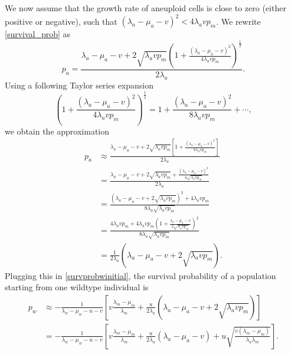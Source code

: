 \documentclass[12pt]{extarticle}
\begin{document}
We now assume that the growth rate of aneuploid cells is close to zero (either positive or negative), such that  $\left(\lambda_a-\mu_a-v\right)^2 < 4\lambda_avp_m$.
We rewrite \cref{survival_prob} as
\begin{equation}
p_a=\frac{\lambda_a-\mu_a-v+2\sqrt{\lambda_a vp_m}\left(1+\frac{\left(\lambda_a-\mu_a-v\right)^2}{4\lambda_avp_m}\right)^{\frac12}}{2\lambda_a} .
\end{equation}
Using a following Taylor series expansion
\begin{equation*}
\left(1+\frac{\left(\lambda_a-\mu_a-v\right)^2}{4\lambda_avp_m}\right)^{\frac{1}{2}}=1+\frac{\left(\lambda_a-\mu_a-v\right)^2}{8\lambda_avp_m}+\cdots,
\end{equation*}
we obtain the approximation
\begin{equation}
\begin{aligned}
p_a&\approx\frac{\lambda_a-\mu_a-v+2\sqrt{\lambda_a vp_m}\left[1+\frac{\left(\lambda_a-\mu_a-v\right)^2}{8\lambda_avp_m}\right]}{2\lambda_a}\\
&=\frac{\lambda_a-\mu_a-v+2\sqrt{\lambda_a vp_m}+\frac{\left(\lambda_a-\mu_a-v\right)^2}{4\sqrt{\lambda_avp_m}}}{2\lambda_a}\\
&=\frac{\left(\lambda_a-\mu_a-v+2\sqrt{\lambda_avp_m}\right)^2+4\lambda_avp_m}{8\lambda_a\sqrt{\lambda_avp_m}}\\
&=\frac{4\lambda_avp_m+4\lambda_avp_m\left(1+\frac{\lambda_a-\mu_a-v}{2\sqrt{\lambda_avp_m}}\right)^2}{8\lambda_a\sqrt{\lambda_avp_m}}\\
&=\frac{1}{2\lambda_a}\left(\lambda_a-\mu_a-v+2\sqrt{\lambda_avp_m}\right).
\end{aligned}
\end{equation}
Plugging this in \cref{survprobwinitial}, the survival probability of a population starting from one wildtype individual is
\begin{equation}\label{scenario3}
\begin{aligned}
p_w&\approx-\frac{1}{\lambda_w-\mu_w-u-v}\left[v\frac{\lambda_m-\mu_m}{\lambda_m}+\frac{u}{2\lambda_a}\left(\lambda_a-\mu_a-v+2\sqrt{\lambda_avp_m}\right)\right]\\
&=-\frac{1}{\lambda_w-\mu_w-u-v}\left[v\frac{\lambda_m-\mu_m}{\lambda_m}+\frac{u}{2\lambda_a}\left(\lambda_a-\mu_a-v\right)+u\sqrt{\frac{v\left(\lambda_m-\mu_m\right)}{\lambda_a\lambda_m}}\right].
\end{aligned}
\end{equation}
\end{document}
